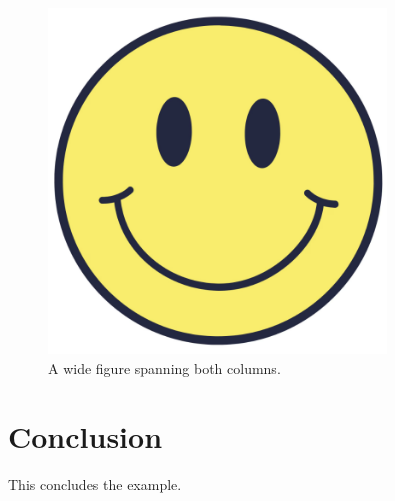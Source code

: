 \begin{figure}[ht]
    \centering
    \includegraphics[width=0.8\textwidth]{../images/smiley.png}
    \caption{A wide figure spanning both columns.}
    \label{fig:wide_figure}
\end{figure}

\section{Conclusion}
This concludes the example.





